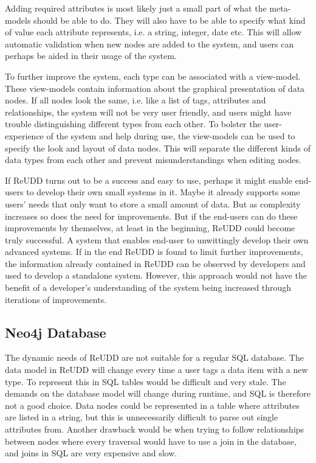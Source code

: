 \documentclass[a4paper]{report}
\begin{document}
Adding required attributes is most likely just a small part of what the meta-models should be able to do. They will also have to be able to specify what kind of value each attribute represents, i.e. a string, integer, date etc. This will allow automatic validation when new nodes are added to the system, and users can perhaps be aided in their usage of the system.

To further improve the system, each type can be associated with a view-model. These view-models contain information about the graphical presentation of data nodes. If all nodes look the same, i.e. like a list of tags, attributes and relationships, the system will not be very user friendly, and users might have trouble distinguishing different types from each other. To bolster the user-experience of the system and help during use, the view-models can be used to specify the look and layout of data nodes. This will separate the different kinds of data types from each other and prevent misunderstandings when editing nodes.

If ReUDD turns out to be a success and easy to use, perhaps it might enable end-users to develop their own small systems in it. Maybe it already supports some users' needs that only want to store a small amount of data. But as complexity increases so does the need for improvements. But if the end-users can do these improvements by themselves, at least in the beginning, ReUDD could become truly successful. A system that enables end-user to unwittingly develop their own advanced systems. If in the end ReUDD is found to limit further improvements, the information already contained in ReUDD can be observed by developers and used to develop a standalone system. However, this approach would not have the benefit of a developer's understanding of the system being increased through iterations of improvements.

\subsection{Neo4j Database}
The dynamic needs of ReUDD are not suitable for a regular SQL database. The data model in ReUDD will change every time a user tags a data item with a new type. To represent this in SQL tables would be difficult and very stale. The demands on the database model will change during runtime, and SQL is therefore not a good choice. Data nodes could be represented in a table where attributes are listed in a string, but this is unnecessarily difficult to parse out single attributes from. Another drawback would be when trying to follow relationships between nodes where every traversal would have to use a join in the database, and joins in SQL are very expensive and slow.
\end{document}
